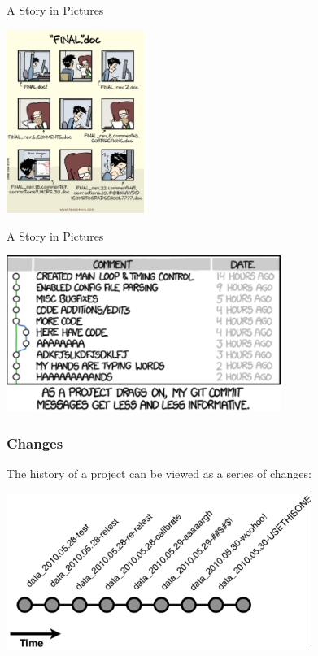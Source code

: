   \begin{frame}[t]{A Story in Pictures} 
    \begin{center}
      \includegraphics[height=2.350in]{./images/phd101212s} 
    \end{center} 
  \end{frame}


  \begin{frame}[t]{A Story in Pictures} 
    \begin{center}
      \includegraphics[height=2.000in]{./images/xkcd_git_commit} 
    \end{center} 
  \end{frame}


  \begin{frame}[t]
    \frametitle{Changes}
    The history of a project can be viewed as a series of changes:
    \begin{center}
      \includegraphics[height=2.00in]{./images/from-wickham-01} 
    \end{center} 
  \end{frame}

